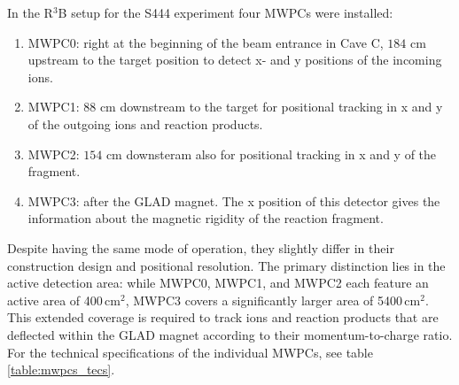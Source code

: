 In the R$^3$B setup for the S444 experiment four MWPCs were installed:\newline
\begin{enumerate}
\item MWPC0: right at the beginning of the beam entrance in Cave C, $184$ cm upstream to the target position to detect x- and y positions of the incoming ions.
\item MWPC1: $88$ cm downstream to the target for positional tracking in x and y of the outgoing ions and reaction products.
\item MWPC2: $154$ cm downsteram also for positional tracking in x and y of the fragment.
\item MWPC3: after the GLAD magnet. The x position of this detector gives the information about the magnetic rigidity of the reaction fragment.  %
\end{enumerate}
Despite having the same mode of operation, they slightly differ in their construction design and positional resolution. The primary distinction lies in the active detection area: while MWPC0, MWPC1, and MWPC2 each feature an active area of 400 cm$^2$, MWPC3 covers a significantly larger area of 5400 cm$^2$. This extended coverage is required to track ions and reaction products that are deflected within the GLAD magnet according to their momentum-to-charge ratio. For the technical specifications of the individual MWPCs, see table \ref{table:mwpcs_tecs}.
